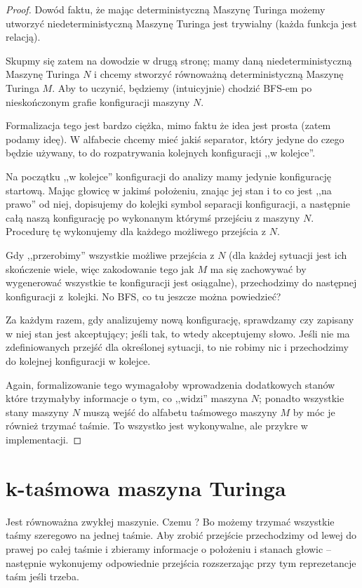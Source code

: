 \begin{proof}
    Dowód faktu, że mając deterministyczną Maszynę Turinga możemy utworzyć niedeterministyczną Maszynę Turinga jest trywialny (każda funkcja jest relacją). 
    
    Skupmy się zatem na dowodzie w drugą stronę; mamy daną niedeterministyczną Maszynę Turinga \(N\) i chcemy stworzyć równoważną deterministyczną Maszynę Turinga \(M\). Aby to uczynić, będziemy (intuicyjnie) chodzić BFS-em po nieskończonym grafie konfiguracji maszyny \(N\).
    
    Formalizacja tego jest bardzo ciężka, mimo faktu że idea jest prosta (zatem podamy ideę). W alfabecie chcemy mieć jakiś separator, który jedyne do czego będzie używany, to do rozpatrywania kolejnych konfiguracji ,,w kolejce''. 
    
    Na początku ,,w kolejce'' konfiguracji do analizy mamy jedynie konfigurację startową. Mając głowicę w jakimś położeniu, znając jej stan i to co jest ,,na prawo'' od niej, dopisujemy do kolejki symbol separacji konfiguracji, a następnie całą naszą konfigurację po wykonanym którymś przejściu z maszyny \(N\). Procedurę tę wykonujemy dla każdego możliwego przejścia z \(N\). 
    
    Gdy ,,przerobimy'' wszystkie możliwe przejścia z \(N\) (dla każdej sytuacji jest ich skończenie wiele, więc zakodowanie tego jak \(M\) ma się zachowywać by wygenerować wszystkie te konfiguracji jest osiągalne), przechodzimy do następnej konfiguracji z~kolejki. No BFS, co tu jeszcze można powiedzieć?
    
    Za każdym razem, gdy analizujemy nową konfigurację, sprawdzamy czy zapisany w niej stan jest akceptujący; jeśli tak, to wtedy akceptujemy słowo. Jeśli nie ma zdefiniowanych przejść dla określonej sytuacji, to nie robimy nic i przechodzimy do kolejnej konfiguracji w kolejce.
    
    Again, formalizowanie tego wymagałoby wprowadzenia dodatkowych stanów które trzymałyby informacje o tym, co ,,widzi'' maszyna \(N\); ponadto wszystkie stany maszyny \(N\) muszą wejść do alfabetu taśmowego maszyny \(M\) by móc je również trzymać taśmie. To wszystko jest wykonywalne, ale przykre w implementacji. 
\end{proof}

\section{k-taśmowa maszyna Turinga}

Jest równoważna zwykłej maszynie. Czemu ? Bo możemy trzymać wszystkie taśmy szeregowo na jednej taśmie. Aby zrobić przejście przechodzimy od lewej do prawej po całej taśmie i zbieramy informacje o położeniu i stanach głowic -- następnie wykonujemy odpowiednie przejścia rozszerzając przy tym reprezetancje taśm jeśli trzeba.


